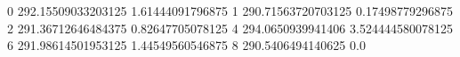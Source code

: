 0 292.15509033203125 1.61444091796875
1 290.71563720703125 0.17498779296875
2 291.36712646484375 0.82647705078125
4 294.0650939941406 3.524444580078125
6 291.98614501953125 1.44549560546875
8 290.5406494140625 0.0
